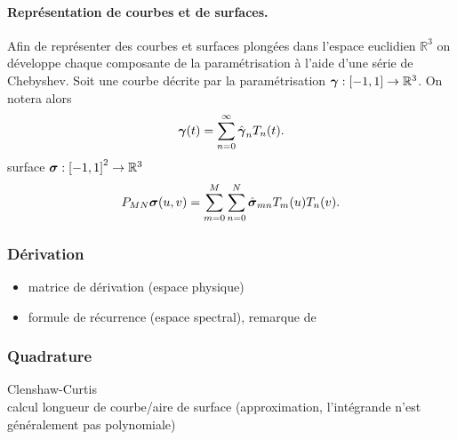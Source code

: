 %

\paragraph{Représentation de courbes et de surfaces.}
Afin de représenter des courbes et surfaces plongées dans l'espace euclidien $\mathbb{R}^3$ on développe chaque composante de la paramétrisation à l'aide d'une série de Chebyshev.
Soit une courbe décrite par la paramétrisation $\boldsymbol{\gamma} : \left[ -1, 1 \right] \to \mathbb{R}^3$. On notera alors
\begin{equation}
	\boldsymbol{\gamma}(t) = \sum_{n=0}^{\infty} \hat{\boldsymbol{\gamma}}_{n} T_n(t).
\end{equation}
surface $\boldsymbol{\sigma} : \left[ -1, 1 \right]^2 \to \mathbb{R}^3$
\begin{equation}
	P_{MN}{\boldsymbol{\sigma}}(u,v) = \sum_{m=0}^{M} \sum_{n=0}^{N} \hat{\boldsymbol{\sigma}}_{mn} T_m(u) T_n(v).
\end{equation}


\subsubsection{Dérivation}
\begin{itemize}
	\item matrice de dérivation (espace physique)
	\item formule de récurrence (espace spectral), remarque de \cite[Section~2.3, p~.94]{wengle1978}%
\end{itemize}

\subsubsection{Quadrature}
Clenshaw-Curtis\\
calcul longueur de courbe/aire de surface (approximation, l'intégrande n'est généralement pas polynomiale)




